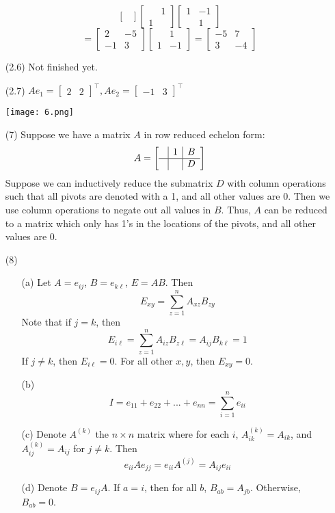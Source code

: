 \documentclass[openany]{book}
\begin{document}
\begin{itemize}
$$\begin{bmatrix}
\end{bmatrix}\begin{bmatrix}
& 1 \\
1 &
\end{bmatrix}\begin{bmatrix}
1 & -1 \\
& 1
\end{bmatrix}$$
$$= \begin{bmatrix}
2 & -5 \\
-1 & 3
\end{bmatrix}\begin{bmatrix}
& 1 \\
1 & -1
\end{bmatrix} = \begin{bmatrix}
-5 & 7 \\
3 & -4
\end{bmatrix}$$
\item[(2.6)]
Not finished yet.
\item[(2.7)]
$Ae_1 = \begin{bmatrix}
2 & 2
\end{bmatrix}^\top, Ae_2 = \begin{bmatrix}
-1 & 3
\end{bmatrix}^\top$

\texttt{[image: 6.png]}
\item[(7)]
Suppose we have a matrix $A$ in row reduced echelon form:
$$A = \begin{bmatrix}
\begin{array}{c|c|c}
& 1 & B \\
\hline
& & D
\end{array}
\end{bmatrix}$$
Suppose we can inductively reduce the submatrix $D$ with column operations such that all pivots are denoted with a 1, and all other values are 0. Then we use column operations to negate out all values in $B$. Thus, $A$ can be reduced to a matrix which only has 1's in the locations of the pivots, and all other values are 0.
\item[(8)]
\begin{itemize}
\item[(a)]
Let $A = e_{ij}$, $B = e_{k\ell}$, $E = AB$. Then
$$E_{xy} = \sum_{z = 1}^n A_{xz}B_{zy}$$
Note that if $j=k$, then
$$E_{i\ell} = \sum_{z=1}^n A_{iz}B_{z\ell} = A_{ij}B_{k\ell} = 1$$
If $j \neq k$, then $E_{i\ell} = 0$. For all other $x, y$, then $E_{xy} = 0$. 
\item[(b)]
$$I = e_{11} + e_{22} + ... + e_{nn} = \sum_{i=1}^n e_{ii}$$
\item[(c)]
Denote $A^{(k)}$ the $n \times n$ matrix where for each $i$, $A^{(k)}_{ik} = A_{ik}$, and $A^{(k)}_{ij} = A_{ij}$ for $j \neq k$. Then
$$e_{ii}Ae_{jj} = e_{ii}A^{(j)} = A_{ij}e_{ii}$$
\item[(d)]
Denote $B = e_{ij}A$. If $a = i$, then for all $b$, $B_{ab} = A_{jb}$. Otherwise, $B_{ab} = 0$.


\end{itemize}
\end{itemize}
\end{document}
